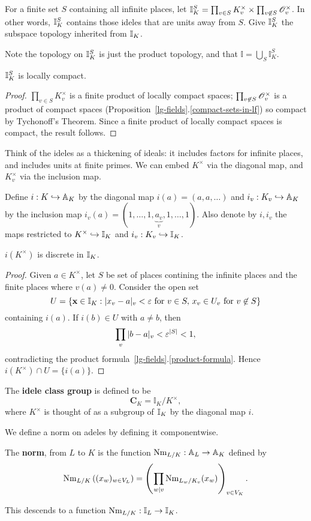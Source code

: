 \begin{df}
For a finite set $S$ containing all infinite places, let $\mathbb I_K^S=\prod_{v\in S} K^{\times}_v\times \prod_{v\not\in S} \mathscr{O}_v^{\times}$. In other words, $\mathbb{I}_K^S$ contains those ideles that are units away from $S$.
Give $\mathbb{I}_K^S$ the subspace topology inherited from $\mathbb{I}_K$.
\end{df}
Note the topology on $\mathbb{I}_K^S$ is just the product topology, and that $\mathbb I=\bigcup_{S} \mathbb I_K^S$.
\begin{pr}
$\mathbb{I}_K^S$ is locally compact.
\end{pr}
\begin{proof}
$\prod_{v\in S} K^{\times}_v$ is a finite product of locally compact spaces; $\prod_{v\not\in S} \mathscr{O}_v^{\times}$ is a product of compact spaces (Proposition~\ref{lg-fields}.\ref{compact-sets-in-lf}) so compact by Tychonoff's Theorem. Since a finite product of locally compact spaces is compact, the result follows.
\end{proof}

Think of the ideles as a thickening of ideals: it includes factors for infinite places, and includes units at finite primes. We can embed $K^{\times}$ via the diagonal map, and $K_v^{\times}$ via the inclusion map.
\begin{df}
Define $i:K\hookrightarrow \mathbb{A}_K$ by the diagonal map $i(a)=(a,a,\ldots)$ and $i_v:K_v\hookrightarrow \mathbb{A}_K$ by the inclusion map $i_v(a)=(1,\ldots, 1,\underbrace{a_v}_v,1,\ldots, 1)$. Also denote by $i,i_v$ the maps restricted to $K^{\times}\hookrightarrow \mathbb{I}_K$ and $i_v:K_v\hookrightarrow \mathbb{I}_K$.
\end{df}
\begin{pr}
$i(K^{\times})$ is discrete in $\mathbb{I}_K$.
\end{pr}
\begin{proof}
Given $a\in K^{\times}$, let $S$ be set of places contining the infinite places and the finite places where $v(a)\ne 0$. 
Consider the open set
\[
U=\left\{{\mathbf x\in \mathbb{I}_K}:{|x_v-a|_v<\varepsilon\text{ for }v\in S, \, x_v\in U_v\text{ for }v\not\in S}\right\}
\]
containing $i(a)$. If $i(b)\in U$ with $a\ne b$, then
\[
\prod_v|b-a|_v<\varepsilon^{|S|}<1,
\]
contradicting the product formula~\ref{lg-fields}.\ref{product-formula}. Hence $i(K^{\times})\cap U=\{i(a)\}$.
\end{proof}
\begin{df}
The \textbf{idele class group} is defined to be 
\[\mathbf C_K=\mathbb I_K/K^{\times},\]
where $K^{\times}$ is thought of as a subgroup of $\mathbb{I}_K$ by the diagonal map $i$.
\end{df}
We define a norm on adeles by defining it componentwise.
\begin{df}
The \textbf{norm}, from $L$ to $K$ is the function $\operatorname{Nm}_{L/K}:\mathbb A_L\to \mathbb A_K$ defined by
\[
\operatorname{Nm}_{L/K}\left( {(x_w)_{w\in V_L}} \right)=\left( {\prod_{w\mid v} \operatorname{Nm}_{L_w/K_v}(x_w)} \right)_{v\in V_K}.
\]
\end{df}
This descends to a function $\operatorname{Nm}_{L/K}:\mathbb{I}_L\to \mathbb{I}_K$.

